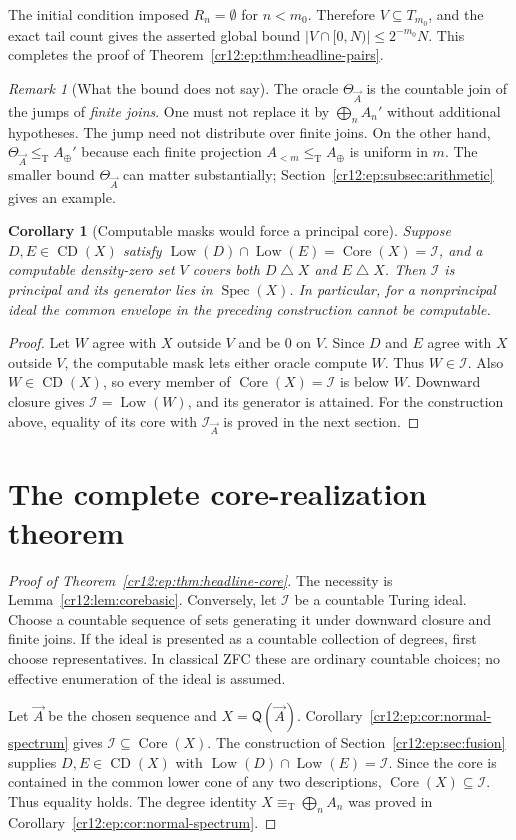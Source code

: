 \documentclass[11pt,letterpaper]{article}
\theoremstyle{plain}
\newtheorem{corollary}[theorem]{Corollary}
\theoremstyle{definition}
\theoremstyle{remark}
\newtheorem{remark}[theorem]{Remark}
\numberwithin{equation}{section}
\newcommand{\leT}{\leq_{\mathrm T}}
\newcommand{\eqT}{\equiv_{\mathrm T}}
\newcommand{\Core}{\operatorname{Core}}
\newcommand{\CD}{\operatorname{CD}}
\newcommand{\Low}{\operatorname{Low}}
\newcommand{\Spec}{\operatorname{Spec}}
\newcommand{\sd}{\mathbin{\triangle}}
\newcommand{\I}{\mathcal I}
\newcommand{\Aplus}{A_{\oplus}}          %
\newcommand{\Alt}[1]{A_{<#1}}            %
\newcommand{\QQ}{\mathsf Q}              %
\begin{document}
The initial condition imposed $R_n=\emptyset$ for $n<m_0$. Therefore
$V\subseteq T_{m_0}$, and the exact tail count gives the asserted global bound
$|V\cap[0,N)|\le2^{-m_0}N$. This completes the proof of
Theorem~\ref{cr12:ep:thm:headline-pairs}.

\begin{remark}[What the bound does not say]
The oracle $\Theta_{\vec A}$ is the countable join of the jumps of \emph{finite
joins}. One must not replace it by $\bigoplus_n A_n'$ without additional hypotheses.
The jump need not distribute over finite joins. On the other hand,
$\Theta_{\vec A}\leT \Aplus'$ because each finite projection $\Alt m\leT \Aplus$ is
uniform in $m$. The smaller bound $\Theta_{\vec A}$ can matter substantially;
Section~\ref{cr12:ep:subsec:arithmetic} gives an example.
\end{remark}

\begin{corollary}[Computable masks would force a principal core]\label{cr12:ep:cor:mask}
Suppose $D,E\in\CD(X)$ satisfy $\Low(D)\cap\Low(E)=\Core(X)=\I$, and a computable
density-zero set $V$ covers both $D\sd X$ and $E\sd X$. Then $\I$ is principal and
its generator lies in $\Spec(X)$. In particular, for a nonprincipal ideal the common
envelope in the preceding construction cannot be computable.
\end{corollary}
\begin{proof}
Let $W$ agree with $X$ outside $V$ and be $0$ on $V$. Since $D$ and $E$ agree with
$X$ outside $V$, the computable mask lets either oracle compute $W$. Thus $W\in\I$.
Also $W\in\CD(X)$, so every member of $\Core(X)=\I$ is below $W$. Downward closure
gives $\I=\Low(W)$, and its generator is attained. For the construction above,
equality of its core with $\I_{\vec A}$ is proved in the next section.
\end{proof}

\section{The complete core-realization theorem}\label{cr12:ep:sec:realization}
\begin{proof}[Proof of Theorem~\ref{cr12:ep:thm:headline-core}]
The necessity is Lemma~\ref{cr12:lem:corebasic}. Conversely, let $\I$ be a countable
Turing ideal. Choose a countable sequence of sets generating it under downward
closure and finite joins. If the ideal is presented as a countable collection of
degrees, first choose representatives. In classical ZFC these are ordinary countable
choices; no effective enumeration of the ideal is assumed.

Let $\vec A$ be the chosen sequence and $X=\QQ(\vec A)$.
Corollary~\ref{cr12:ep:cor:normal-spectrum} gives $\I\subseteq\Core(X)$. The
construction of Section~\ref{cr12:ep:sec:fusion} supplies $D,E\in\CD(X)$ with
$\Low(D)\cap\Low(E)=\I$. Since the core is contained in the common lower cone of any
two descriptions, $\Core(X)\subseteq\I$. Thus equality holds. The degree identity
$X\eqT\bigoplus_n A_n$ was proved in Corollary~\ref{cr12:ep:cor:normal-spectrum}.
\end{proof}
\end{document}
